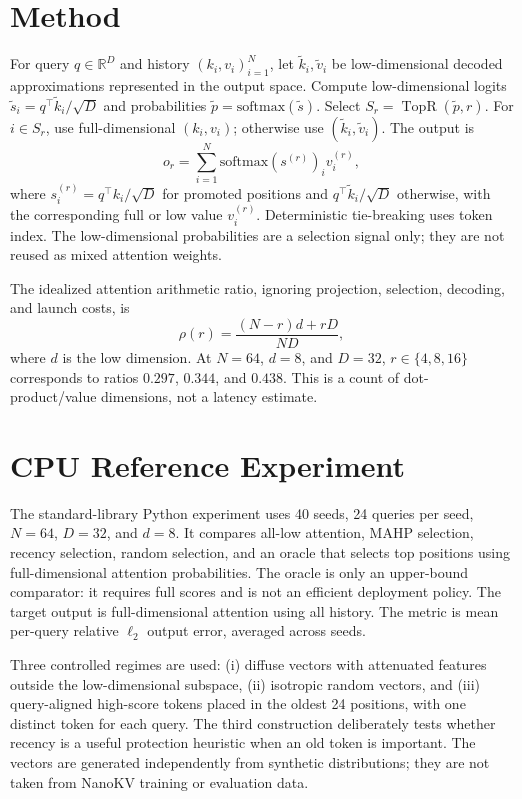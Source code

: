 \documentclass[11pt]{article}
\begin{document}
\section{Method}
For query $q\in\mathbb{R}^{D}$ and history $(k_i,v_i)_{i=1}^{N}$, let $\tilde{k}_i,\tilde{v}_i$ be low-dimensional decoded approximations represented in the output space. Compute low-dimensional logits $\tilde{s}_i=q^\top\tilde{k}_i/\sqrt{D}$ and probabilities $\tilde{p}=\mathrm{softmax}(\tilde{s})$. Select $S_r=\operatorname{TopR}(\tilde{p},r)$. For $i\in S_r$, use full-dimensional $(k_i,v_i)$; otherwise use $(\tilde{k}_i,\tilde{v}_i)$. The output is
\begin{equation}
o_r=\sum_{i=1}^{N} \mathrm{softmax}(s^{(r)})_i v_i^{(r)},
\end{equation}
where $s_i^{(r)}=q^\top k_i/\sqrt{D}$ for promoted positions and $q^\top\tilde{k}_i/\sqrt{D}$ otherwise, with the corresponding full or low value $v_i^{(r)}$. Deterministic tie-breaking uses token index. The low-dimensional probabilities are a selection signal only; they are not reused as mixed attention weights.

The idealized attention arithmetic ratio, ignoring projection, selection, decoding, and launch costs, is
\begin{equation}
\rho(r)=\frac{(N-r)d + rD}{ND},
\end{equation}
where $d$ is the low dimension. At $N=64$, $d=8$, and $D=32$, $r\in\{4,8,16\}$ corresponds to ratios $0.297$, $0.344$, and $0.438$. This is a count of dot-product/value dimensions, not a latency estimate.

\section{CPU Reference Experiment}
The standard-library Python experiment uses 40 seeds, 24 queries per seed, $N=64$, $D=32$, and $d=8$. It compares all-low attention, MAHP selection, recency selection, random selection, and an oracle that selects top positions using full-dimensional attention probabilities. The oracle is only an upper-bound comparator: it requires full scores and is not an efficient deployment policy. The target output is full-dimensional attention using all history. The metric is mean per-query relative $\ell_2$ output error, averaged across seeds.

Three controlled regimes are used: (i) diffuse vectors with attenuated features outside the low-dimensional subspace, (ii) isotropic random vectors, and (iii) query-aligned high-score tokens placed in the oldest 24 positions, with one distinct token for each query. The third construction deliberately tests whether recency is a useful protection heuristic when an old token is important. The vectors are generated independently from synthetic distributions; they are not taken from NanoKV training or evaluation data.
\end{document}
